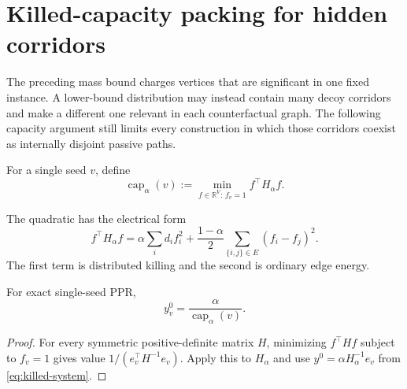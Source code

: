 \section{Killed-capacity packing for hidden corridors}
\label{sec:capacity-packing}

The preceding mass bound charges vertices that are significant in one fixed
instance.  A lower-bound distribution may instead contain many decoy
corridors and make a different one relevant in each counterfactual graph.
The following capacity argument still limits every construction in which
those corridors coexist as internally disjoint passive paths.

\begin{definition}
\label{def:killed-capacity}
For a single seed $v$, define
\begin{equation}
 \operatorname{cap}_\alpha(v)
 :=\min_{f\in\mathbb R^V:\,f_v=1} f^\top H_\alpha f.
 \label{eq:killed-capacity}
\end{equation}
\end{definition}

The quadratic has the electrical form
\begin{equation}
 f^\top H_\alpha f
 =\alpha\sum_i d_i f_i^2
  +\frac{1-\alpha}{2}
    \sum_{\{i,j\}\in E}(f_i-f_j)^2.
 \label{eq:killed-energy}
\end{equation}
The first term is distributed killing and the second is ordinary edge
energy.

\begin{lemma}
\label{lem:capacity-ppr}
For exact single-seed PPR,
\begin{equation}
 y_v^0=\frac{\alpha}{\operatorname{cap}_\alpha(v)}.
 \label{eq:capacity-ppr}
\end{equation}
\end{lemma}

\begin{proof}
For every symmetric positive-definite matrix $H$, minimizing
$f^\top Hf$ subject to $f_v=1$ gives value
$1/(e_v^\top H^{-1}e_v)$.  Apply this to $H_\alpha$ and use
$y^0=\alpha H_\alpha^{-1}e_v$ from \cref{eq:killed-system}.
\end{proof}

